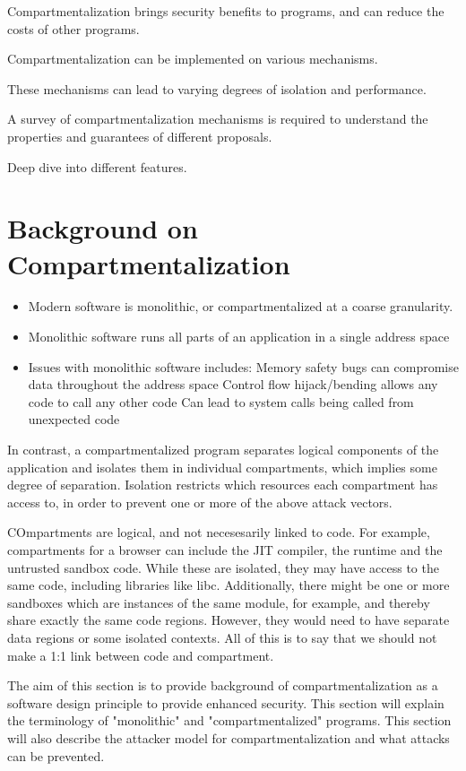 Compartmentalization brings security benefits to programs, and can reduce the
costs of other programs.

Compartmentalization can be implemented on various mechanisms.

These mechanisms can lead to varying degrees of isolation and performance.

A survey of compartmentalization mechanisms is required to understand the
properties and guarantees of different proposals.

Deep dive into different features.


\section{Background on Compartmentalization}

\begin{itemize}
      \item Modern software is monolithic, or compartmentalized at a coarse granularity.
      \item Monolithic software runs all parts of an application in a single address space
      \item Issues with monolithic software includes:
            Memory safety bugs can compromise data throughout the address space
            Control flow hijack/bending allows any code to call any other code
            Can lead to system calls being called from unexpected code
\end{itemize}

In contrast, a compartmentalized program separates logical components of the application
and isolates them in individual compartments, which implies some degree of separation.
Isolation restricts which resources each compartment has access to, in order to prevent
one or more of the above attack vectors.

COmpartments are logical, and not necesesarily linked to code. 
For example, compartments for a browser can include the JIT compiler, the runtime and the
untrusted sandbox code. 
While these are isolated, they may have access to the same code, including libraries like
libc.
Additionally, there might be one or more sandboxes which are instances of the same module,
for example, and thereby share exactly the same code regions. 
However, they would need to have separate data regions or some isolated contexts.
All of this is to say that we should not make a 1:1 link between code and compartment.

The aim of this section is to provide background of compartmentalization as a software design principle to provide enhanced security. This section will explain the terminology of "monolithic" and "compartmentalized" programs. This section will also describe the attacker model for compartmentalization and what attacks can be prevented.

